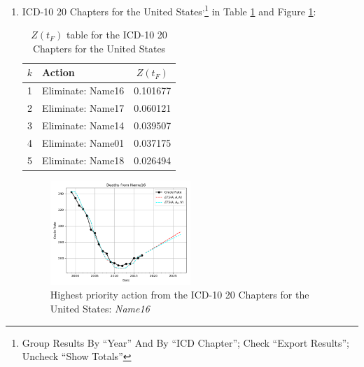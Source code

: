 \documentclass[12pt, a4paper, twocolumn]{article}
\begin{document}
\begin{enumerate}
  \vfill\eject
  \item ICD-10 20 Chapters for the United States\cite{centers2017underlying}\textsuperscript{,}\footnote{Group Results By \enquote{Year} And By \enquote{ICD Chapter}; Check \enquote{Export Results}; Uncheck \enquote{Show Totals}} in Table \ref{table:ztable5} and Figure \ref{fig:k5}:
    \begin{table}[H]
      \centering
      \begin{tabular}{clc}
        \toprule
          $k$ & Action            & $Z(t_F)$ \\
        \midrule
          1   & Eliminate: Name16 & 0.101677 \\
          2   & Eliminate: Name17 & 0.060121 \\
          3   & Eliminate: Name14 & 0.039507 \\
          4   & Eliminate: Name01 & 0.037175 \\
          5   & Eliminate: Name18 & 0.026494 \\
        \bottomrule
      \end{tabular}
      \caption{$Z(t_F)$ table for the ICD-10 20 Chapters for the United States}
      \label{table:ztable5}
    \end{table}
    \begin{figure}[H]
      \centering
      \includegraphics[width=0.5\textwidth]{results/US_ICD10_CHAPTERS/Name16_ets.png}
      \caption{Highest priority action from the ICD-10 20 Chapters for the United States: \textit{Name16}}\label{fig:k5}
    \end{figure}
  

\end{enumerate}
\end{document}

